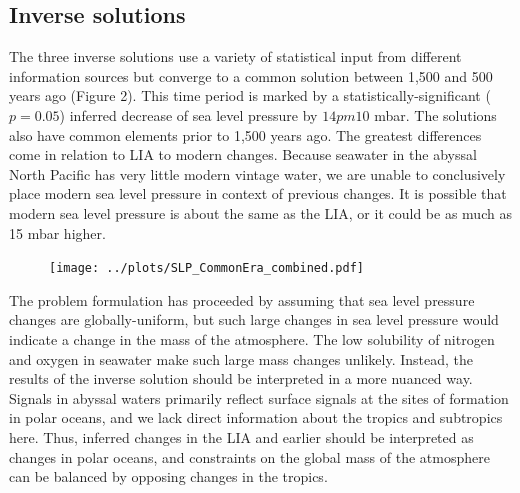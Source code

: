 \documentclass[12pt]{article}
\begin{document}
\subsection{Inverse solutions}

The three inverse solutions use a variety of statistical input from different information sources but converge to a common solution between 1,500 and 500 years ago (Figure 2). This time period is marked by a statistically-significant ($p=0.05$) inferred decrease of sea level pressure by $14 pm 10$ mbar. The solutions also have common elements prior to 1,500 years ago.
The greatest differences come in relation to LIA to modern changes. Because seawater in the abyssal North Pacific has very little modern vintage water, we are unable to conclusively place modern sea level pressure in context of previous changes. It is possible that modern sea level pressure is about the same as the LIA, or it could be as much as 15 mbar higher. 

\begin{figure}[htbp]
 \begin{center}
 \texttt{[image: ../plots/SLP\_CommonEra\_combined.pdf]} \\
  \end{center} 
\end{figure}

The problem formulation has proceeded by assuming that sea level pressure changes are globally-uniform, but such large changes in sea level pressure would indicate a change in the mass of the atmosphere. The low solubility of nitrogen and oxygen in seawater make such large mass changes unlikely. Instead, the results of the inverse solution should be interpreted in a more nuanced way. Signals in abyssal waters primarily reflect surface signals at the sites of formation in polar oceans, and we lack direct information about the tropics and subtropics here. Thus, inferred changes in the LIA and earlier should be interpreted as changes in polar oceans, and constraints on the global mass of the atmosphere can be balanced by opposing changes in the tropics.
\end{document}
